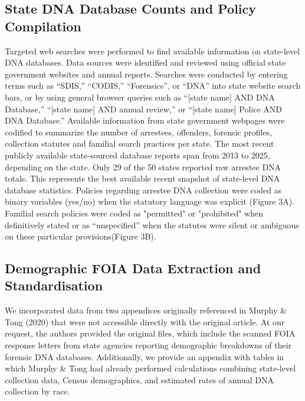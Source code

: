 \documentclass{article}
\begin{document}
\subsection*{State DNA Database Counts and Policy Compilation}
Targeted web searches were performed to find available information on state-level DNA databases. Data sources were identified and reviewed using official state government websites and annual reports. Searches were conducted by entering terms such as ``SDIS,'' ``CODIS,'' ``Forensics'', or ``DNA'' into state website search bars, or by using general browser queries such as ``[state name] AND DNA Database,'' ``[state name] AND annual review,'' or ``[state name] Police AND DNA Database.'' Available information from state government webpages were codified to summarize the number of arrestees, offenders, forensic profiles, collection statutes and familial search practices per state. The most recent publicly available state-sourced database reports span from 2013 to 2025, depending on the state. Only 29 of the 50 states reported raw arrestee DNA totals. This represents the best available recent snapshot of state-level DNA database statistics. Policies regarding arrestee DNA collection were coded as binary variables (yes/no) when the statutory language was explicit (Figure 3A). Familial search policies were coded as "permitted" or "prohibited" when definitively stated or as ``unspecified'' when the statutes were silent or ambiguous on these particular provisions(Figure 3B).

\subsection*{Demographic FOIA Data Extraction and Standardisation}

We incorporated data from two appendices originally referenced in Murphy \& Tong (2020) that were not accessible directly with the original article. At our request, the authors provided the original files, which include the scanned FOIA response letters from state agencies reporting demographic breakdowns of their forensic DNA databases. Additionally, we provide an appendix with tables in which Murphy \& Tong had already performed calculations combining state-level collection data, Census demographics, and estimated rates of annual DNA collection by race.
\end{document}
